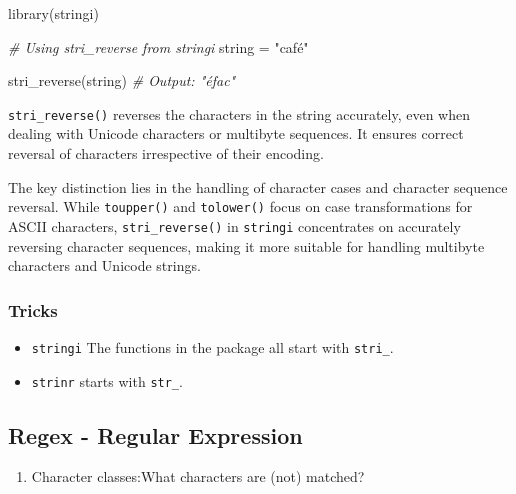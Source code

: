 \documentclass[
]{article}
\newenvironment{Shaded}{}{}
\newcommand{\CommentTok}[1]{\textcolor[rgb]{0.38,0.63,0.69}{\textit{#1}}}
\newcommand{\FunctionTok}[1]{\textcolor[rgb]{0.02,0.16,0.49}{#1}}
\newcommand{\NormalTok}[1]{#1}
\newcommand{\OtherTok}[1]{\textcolor[rgb]{0.00,0.44,0.13}{#1}}
\newcommand{\StringTok}[1]{\textcolor[rgb]{0.25,0.44,0.63}{#1}}
\begin{document}
\begin{enumerate}
\begin{Shaded}
\begin{Highlighting}[]
\FunctionTok{library}\NormalTok{(stringi)}

\CommentTok{\# Using stri\_reverse from stringi}
\NormalTok{string }\OtherTok{=} \StringTok{"café"}

\FunctionTok{stri\_reverse}\NormalTok{(string)}
\CommentTok{\# Output: "éfac"}
\end{Highlighting}
\end{Shaded}

  \texttt{stri\_reverse()} reverses the characters in the string
  accurately, even when dealing with Unicode characters or multibyte
  sequences. It ensures correct reversal of characters irrespective of
  their encoding.
\end{enumerate}

The key distinction lies in the handling of character cases and
character sequence reversal. While \texttt{toupper()} and
\texttt{tolower()} focus on case transformations for ASCII characters,
\texttt{stri\_reverse()} in \texttt{stringi} concentrates on accurately
reversing character sequences, making it more suitable for handling
multibyte characters and Unicode strings.

\hypertarget{tricks}{%
\subsubsection{Tricks}\label{tricks}}

\begin{itemize}
\item
  \texttt{stringi} The functions in the package all start with
  \texttt{stri\_}.
\item
  \texttt{strinr} starts with \texttt{str\_}.
\end{itemize}

\hypertarget{regex---regular-expression}{%
\subsection{Regex - Regular
Expression}\label{regex---regular-expression}}

\begin{enumerate}
\def\labelenumi{\arabic{enumi}.}
\item
  Character classes:What characters are (not) matched?
\end{enumerate}
\end{document}
